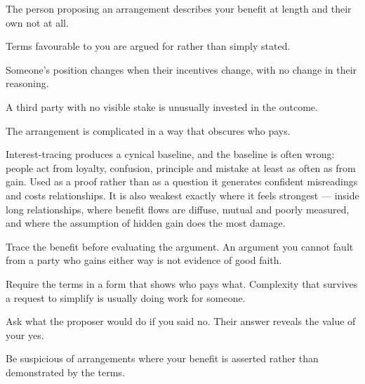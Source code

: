 \begin{feedback}
  \item The person proposing an arrangement describes your benefit at length and their own not at all.
  \item Terms favourable to you are argued for rather than simply stated.
  \item Someone's position changes when their incentives change, with no change in their reasoning.
  \item A third party with no visible stake is unusually invested in the outcome.
  \item The arrangement is complicated in a way that obscures who pays.
\end{feedback}

\begin{failure}
Interest-tracing produces a cynical baseline, and the baseline is often wrong: people act from loyalty, confusion, principle and mistake at least as often as from gain. Used as a proof rather than as a question it generates confident misreadings and costs relationships. It is also weakest exactly where it feels strongest --- inside long relationships, where benefit flows are diffuse, mutual and poorly measured, and where the assumption of hidden gain does the most damage.
\end{failure}

\begin{countermeasures}
  \item Trace the benefit before evaluating the argument. An argument you cannot fault from a party who gains either way is not evidence of good faith.
  \item Require the terms in a form that shows who pays what. Complexity that survives a request to simplify is usually doing work for someone.
  \item Ask what the proposer would do if you said no. Their answer reveals the value of your yes.
  \item Be suspicious of arrangements where your benefit is asserted rather than demonstrated by the terms.
\end{countermeasures}

\seesources
{}

